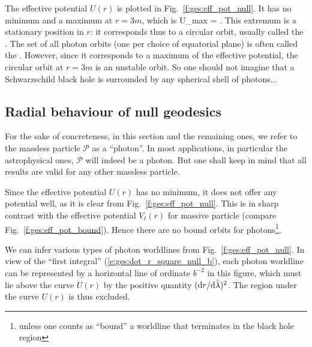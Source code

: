 The effective potential $U(r)$ is plotted in Fig.~\ref{f:ges:eff_pot_null}.
It has no minimum and a maximum at $r=3m$, which is
\be \label{e:ges:U_max}
    U_{\rm max} =  .
\ee
This extremum is a stationary position in $r$: it corresponds thus to a circular
orbit, usually called the .
The set of all photon orbits (one per choice of equatorial plane) is often
called the .
However, since it corresponds to a maximum of the effective potential, the circular
orbit at $r=3m$ is an unstable orbit. So one should not imagine that a
Schwarzschild black hole is surrounded by any spherical shell of photons...


\subsection{Radial behaviour of null geodesics} \label{s:ges:null_radial_behav}

For the sake of concreteness, in this section and the remaining ones, we
refer to the massless particle $\mathscr{P}$ as a ``photon''. In most applications, in
particular the astrophysical ones, $\mathscr{P}$ will indeed be a photon.
But one shall keep in mind that all results are valid for any other massless
particle.

Since the effective potential
$U(r)$ has no minimum, it does not offer any potential well,
as it is clear from Fig.~\ref{f:ges:eff_pot_null}. This is in sharp contrast
with the effective potential $V_\ell(r)$ for massive particle
(compare Fig.~\ref{f:ges:eff_pot_bound}). Hence there are no bound orbits
for photons\footnote{unless one counts as ``bound'' a worldline that terminates in the
black hole region}.

We can infer various types of photon worldlines from Fig.~\ref{f:ges:eff_pot_null}.
In view of the ``first integral'' (\ref{e:ges:dot_r_square_null_b}),
each photon worldline can be represented by a horizontal line of ordinate
$b^{-2}$ in this figure, which must lie above the curve $U(r)$
by the positive quantity $({\mathrm{d} r}/{\mathrm{d}\tilde{\lambda}})^2$. The region under the curve
$U(r)$ is thus excluded.

